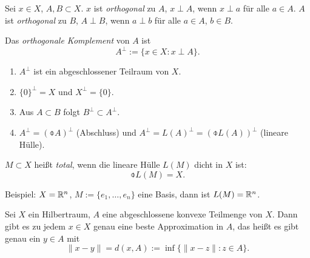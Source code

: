 \documentclass[
 a4paper,
 12pt,
 parskip=half
 ]{scrreprt}
\theoremstyle{plain}
\theoremstyle{definition}
\numberwithin{equation}{section}
\begin{document}
Sei $x \in X$, $A,B \subset X$. $x$ ist \emph{orthogonal} zu $A$, $x \perp A$,
wenn $x \perp a$ für alle $a \in A$. $A$ ist \emph{orthogonal} zu $B$, $A \perp
B$, wenn $a \perp b$ für alle $a \in A$, $b \in B$.

Das \emph{orthogonale Komplement} von $A$ ist
\[ A^\perp := \{ x \in X : x \perp A \}. \]

\renewcommand{\thethm}{O.\arabic{thm}}
\setcounter{thm}{0}
\begin{aufg} %
  \begin{enumerate}
  \item $A^\perp$ ist ein abgeschlossener Teilraum von $X$.
  \item $\{ 0 \}^\perp = X$ und $X^\perp = \{ 0 \}$.
  \item Aus $A \subset B$ folgt $B^\perp \subset A^\perp$.
  \item $A^\perp = (\obar{A})^\perp$ (Abschluss) und $A^\perp = L(A)^\perp =
    (\obar{L(A)})^\perp$ (lineare Hülle).
  \end{enumerate}
\end{aufg}

$M \subset X$ heißt \emph{total}, wenn die lineare Hülle $L(M)$ dicht in $X$
ist:
\[ \obar{L(M)} = X. \]

Beispiel: $X = \mathbb{R}^n$, $M := \{e_1, \ldots, e_n\}$ eine Basis, dann ist
$L(M) = \mathbb{R}^n$.

\begin{thm}[Approximationssatz] %
  Sei $X$ ein Hilbertraum, $A$ eine abgeschlossene konvexe Teilmenge von $X$.
  Dann gibt es zu jedem $x \in X$ genau eine beste Approximation in $A$, das
  heißt es gibt genau ein $y \in A$ mit
  \[ \| x - y \| = d(x,A) := \inf \{ \| x - z \| : z \in A \}. \]
\end{thm}
\end{document}
